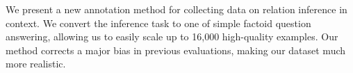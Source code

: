 We present a new annotation method for collecting data on relation inference in context. We convert the inference task to one of simple factoid question answering, allowing us to easily scale up to 16,000 high-quality examples. Our method corrects a major bias in previous evaluations, making our dataset much more realistic.
